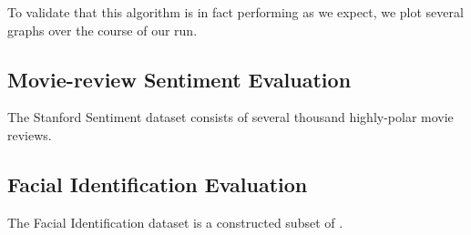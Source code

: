 To validate that this algorithm is in fact performing as we expect, we plot several graphs over the course of our run. 

\subsection{Movie-review Sentiment Evaluation}

The Stanford Sentiment dataset consists of several thousand highly-polar movie reviews.

\subsection{Facial Identification Evaluation}

The Facial Identification dataset is a constructed subset of .


